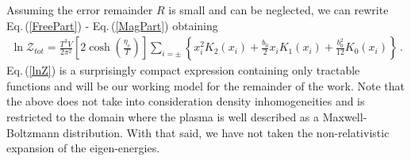 \documentclass[universe,article,submit,moreauthors,pdftex,a4paper]{Definitions/mdpi}
\newcommand{\req}[1]{Eq.\,(\ref{#1})}
\begin{document}
Assuming the error remainder $R$ is small and can be neglected, we can rewrite \req{FreePart} - \req{MagPart} obtaining
\begin{align}
 \label{lnZ}
 \ln\mathcal{Z}_{tot}=\frac{T^3V}{2\pi^2}\left[2\cosh\left(\frac{\eta_{e}}{T}\right)\right]\sum_{i=\pm}\left\{x_i^{2} K_2\left(x_i\right)+\frac{b_0}{2}x_iK_1\left(x_i\right)+\frac{b^2_0}{12}K_0\left(x_i\right)\right\}\,.
\end{align}
\req{lnZ} is a surprisingly compact expression containing only tractable functions and will be our working model for the remainder of the work. Note that the above does not take into consideration density inhomogeneities and is restricted to the domain where the plasma is well described as a Maxwell-Boltzmann distribution. With that said, we have not taken the non-relativistic expansion of the eigen-energies.

\end{document}
